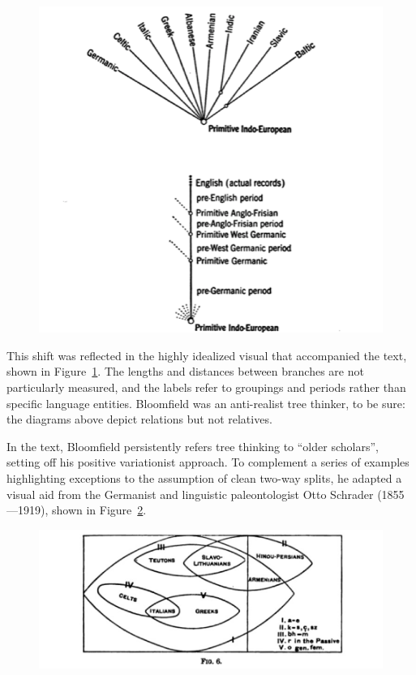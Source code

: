 \documentclass[output=paper]{langscibook}
\begin{document}
\begin{figure}
    \centering
    \includegraphics[scale=1]{figures/bloomfiield1933.png}
    \caption{\citet[312]{Bloomfield1933}}
    \label{fig:kaplan:bloomfield}
\end{figure}

This shift was reflected in the highly idealized visual that accompanied the text, shown in Figure~\ref{fig:kaplan:bloomfield}. The lengths and distances between branches are not particularly measured, and the labels refer to groupings and periods rather than specific language entities. Bloomfield was an anti-realist tree thinker, to be sure: the diagrams above depict relations but not relatives.

In the text, Bloomfield persistently refers tree thinking to ``older scholars'', setting off his positive variationist approach. To complement a series of examples highlighting exceptions to the assumption of clean two-way splits, he adapted a visual aid from the Germanist and linguistic paleontologist Otto Schrader (1855—1919), shown in Figure~\ref{fig:kaplan:schrader}.

\begin{figure}
    \centering
    \includegraphics[scale=0.8]{figures/schrader1890.png}
    \caption{\citet[65]{Schrader1890}}
    \label{fig:kaplan:schrader}
\end{figure}
\end{document}
